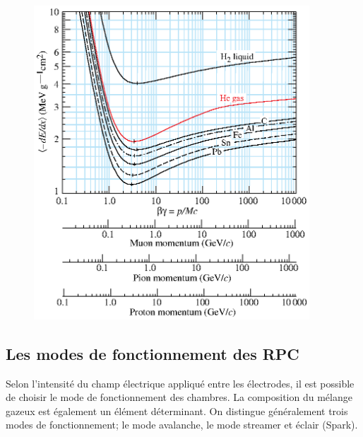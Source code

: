 \begin{figure}[h!]
	\centering
	\includegraphics[width=0.92\textwidth]{RPC/energylost.eps}
	\label{mat}
\end{figure}

\subsection{Les modes de fonctionnement des RPC}
Selon l'intensité du champ électrique appliqué  entre les électrodes, il est possible de choisir le mode de fonctionnement des chambres. La composition du mélange gazeux est également un élément déterminant. On distingue généralement trois modes de fonctionnement; le mode avalanche, le mode streamer et éclair (Spark).

